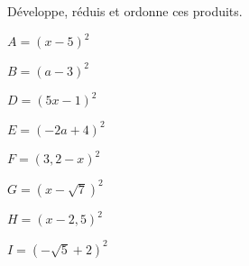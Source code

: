 
Développe, réduis et ordonne ces produits.

\begin{minipage}{5cm}
\begin{description}
\item $A=(x-5)^2$
\item $B=(a-3)^2$
\end{description}
\end{minipage}
\begin{minipage}{5cm}
\begin{description}
\item $D=(5x-1)^2$
\item $E=(-2a+4)^2$
\end{description}
\end{minipage}
\begin{minipage}{5cm}
\begin{description}
\item $F=(3,2-x)^2$
\item $G=(x-\sqrt{7})^2$
\end{description}
\end{minipage}
\begin{minipage}{5cm}
\begin{description}
\item $H=(x-2,5)^2$
\item $I=(-\sqrt{5}+2)^2$
\end{description}
\end{minipage}